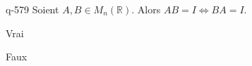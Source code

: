 \begin{truefalse}{q-579}
Soient $A, B \in M_n(\mathbb R)$. Alors $AB=I \Leftrightarrow BA=I$.
\item* Vrai
\item Faux
\end{truefalse}

